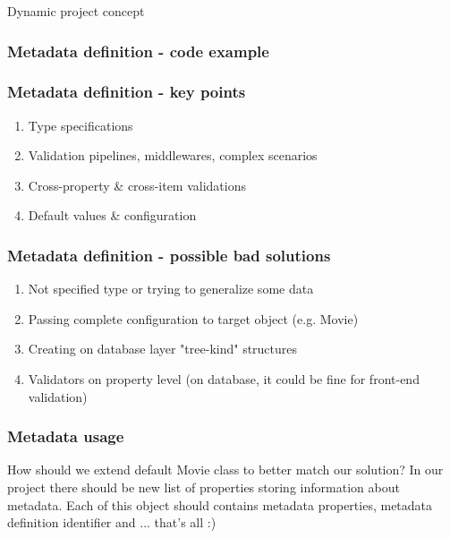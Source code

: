 \documentclass{beamer}
\begin{document}
\begin{section}{Dynamic project concept}
\begin{frame}
\end{frame}

\begin{frame}
\frametitle{Metadata definition - code example \footnotemark[1]}




\end{frame}

\begin{frame}
\frametitle{Metadata definition - key points}

\begin{enumerate}
	\item Type specifications
	\item Validation pipelines, middlewares, complex scenarios
	\item Cross-property \& cross-item validations
	\item Default values \& configuration
\end{enumerate}

\end{frame}

\begin{frame}
\frametitle{Metadata definition - possible bad solutions}

\begin{enumerate}
	\item Not specified type or trying to generalize some data
	\item Passing complete configuration to target object (e.g. Movie)
	\item Creating on database layer "tree-kind" structures
	\item Validators on property level (on database, it could be fine for front-end validation)
\end{enumerate}

\end{frame}

\begin{frame}
\frametitle{Metadata usage}
How should we extend default Movie class to better match our solution? \newline \newline \pause  In our project there should be new list of properties storing information about metadata. Each of this object should contains metadata properties, metadata definition identifier and ... \pause that's all :)
\end{frame}


\end{section}
\end{document}
